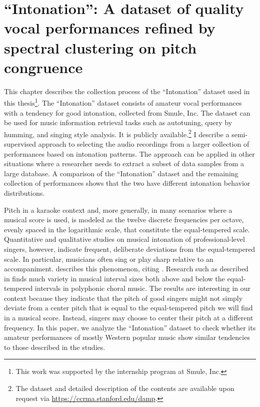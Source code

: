 \chapter{``Intonation'': A dataset of quality vocal performances refined by spectral clustering on pitch congruence}
\label{chap:thesis-damp}
This chapter describes the collection process of the ``Intonation'' dataset used in this thesis\footnote{This work was supported by the internship program at Smule, Inc.}. The ``Intonation'' dataset consists of amateur vocal performances with a tendency for good intonation, collected from Smule, Inc. The dataset can be used for music information retrieval tasks such as autotuning, query by humming, and singing style analysis. It is publicly available.\footnote{The dataset and detailed description of the contents are available upon request via \url{https://ccrma.stanford.edu/damp}.} I describe a semi-supervised approach to selecting the audio recordings from a larger collection of performances based on intonation patterns. The approach can be applied in other situations where a researcher needs to extract a subset of data samples from a large database. A comparison of the ``Intonation'' dataset and the remaining collection of performances shows that the two have different intonation behavior distributions. 

Pitch in a karaoke context and, more generally, in many scenarios where a musical score is used, is modeled as the twelve discrete frequencies per octave, evenly spaced in the logarithmic scale, that constitute the equal-tempered scale. Quantitative and qualitative studies on musical intonation of professional-level singers, however, indicate frequent, deliberate deviations from the equal-tempered scale. In particular, musicians often sing or play sharp relative to an accompaniment. \cite{parncutt2018psychocultural} describes this phenomenon, citing \cite{barbour1938just, schoen1926pitch, cameron1907tonal}. Research such as described in \cite{devaney2011intonation} finds much variety in musical interval sizes both above and below the equal-tempered intervals in polyphonic choral music. The results are interesting in our context because they indicate that the pitch of good singers might not simply deviate from a center pitch that is equal to the equal-tempered pitch we will find in a musical score. Instead, singers may choose to center their pitch at a different frequency. In this paper, we analyze the ``Intonation'' dataset to check whether its amateur performances of mostly Western popular music show similar tendencies to those described in the studies.

